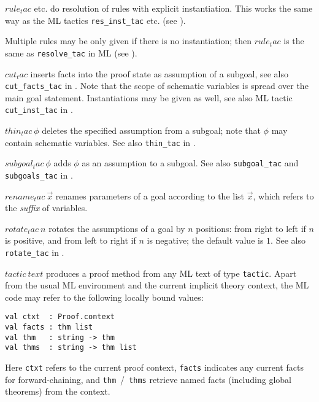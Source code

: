 \begin{descr}

\item [$rule_tac$ etc.] do resolution of rules with explicit instantiation.
  This works the same way as the ML tactics \texttt{res_inst_tac} etc. (see
  \cite[\S3]{isabelle-ref}).

  Multiple rules may be only given if there is no instantiation; then
  $rule_tac$ is the same as \texttt{resolve_tac} in ML (see
  \cite[\S3]{isabelle-ref}).

\item [$cut_tac$] inserts facts into the proof state as assumption of a
  subgoal, see also \texttt{cut_facts_tac} in \cite[\S3]{isabelle-ref}.  Note
  that the scope of schematic variables is spread over the main goal
  statement.  Instantiations may be given as well, see also ML tactic
  \texttt{cut_inst_tac} in \cite[\S3]{isabelle-ref}.

\item [$thin_tac~\phi$] deletes the specified assumption from a subgoal; note
  that $\phi$ may contain schematic variables.  See also \texttt{thin_tac} in
  \cite[\S3]{isabelle-ref}.

\item [$subgoal_tac~\phi$] adds $\phi$ as an assumption to a subgoal.  See
  also \texttt{subgoal_tac} and \texttt{subgoals_tac} in
  \cite[\S3]{isabelle-ref}.

\item [$rename_tac~\vec x$] renames parameters of a goal according to the list
  $\vec x$, which refers to the \emph{suffix} of variables.

\item [$rotate_tac~n$] rotates the assumptions of a goal by $n$ positions:
  from right to left if $n$ is positive, and from left to right if $n$ is
  negative; the default value is $1$.  See also \texttt{rotate_tac} in
  \cite[\S3]{isabelle-ref}.

\item [$tactic~text$] produces a proof method from any ML text of type
  \texttt{tactic}.  Apart from the usual ML environment and the current
  implicit theory context, the ML code may refer to the following locally
  bound values:

{\footnotesize\begin{verbatim}
val ctxt  : Proof.context
val facts : thm list
val thm   : string -> thm
val thms  : string -> thm list
\end{verbatim}}
  Here \texttt{ctxt} refers to the current proof context, \texttt{facts}
  indicates any current facts for forward-chaining, and
  \texttt{thm}~/~\texttt{thms} retrieve named facts (including global
  theorems) from the context.
\end{descr}


